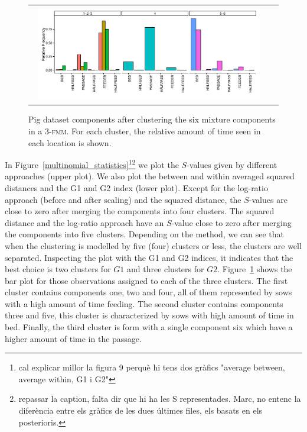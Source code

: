 \documentclass[submit]{smj}
\theoremstyle{definition}
\newcommand{\fmm}{\textsc{fmm}\xspace}
\begin{document}
\begin{figure}[t]
\begin{center}
\begin{tabular}{cc}
  \includegraphics[width=0.95\textwidth]{figures/multinomial_clust3_all.pdf} \\
 \end{tabular}
 \caption{Pig dataset components after clustering the six mixture components in a 3-\fmm. For each cluster, the relative amount of time seen in each location is shown.}\label{multinomial_clust3}
\end{center}
\end{figure}

In Figure~\ref{multinomial_statistics}\footnote{cal explicar millor la figura 9 perquè hi tens dos gràfics "average between, average within, G1 i G2"}\footnote{repassar la caption, falta dir que hi ha les S representades.
Marc, no entenc la diferència entre els gràfics de les dues últimes files, els basats en els posterioris. } we plot the $S$-values given by different approaches (upper plot). We also plot the between and within averaged squared distances and the G1 and G2 index (lower plot). Except for the log-ratio approach (before and after scaling) and the squared distance, the $S$-values are close to zero after merging the components into four clusters. The squared distance and the log-ratio approach have an $S$-value close to zero after merging the components into five clusters. Depending on the method, we can see that when the clustering is modelled by five (four) clusters or less, the clusters are well separated. Inspecting the plot with the G1 and G2 indices, it indicates that the best choice is two clusters for $G1$ and three clusters for $G2$. Figure~\ref{multinomial_clust3} shows the bar plot for those observations assigned to each of the three clusters. The first cluster contains components one, two and four, all of them represented by sows with a high amount of time feeding. The second cluster contains components three and five, this cluster is characterized by sows with high amount of time in bed. Finally, the third cluster is form with a single component six which have a higher amount of time in the passage.
\end{document}
